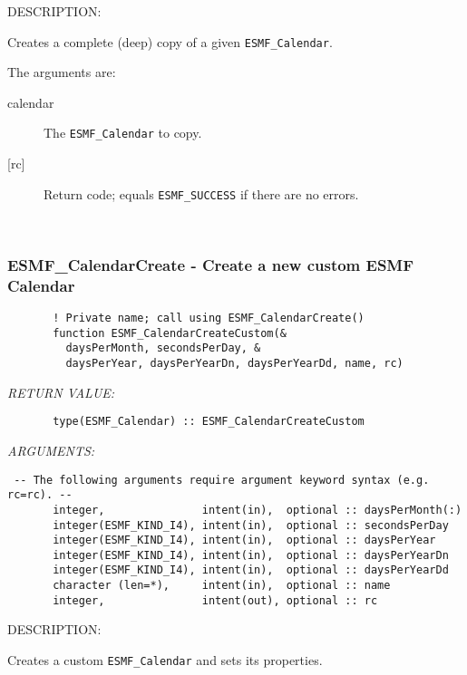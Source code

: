 {\sf DESCRIPTION:\\ }


       Creates a complete (deep) copy of a given {\tt ESMF\_Calendar}.
  
       The arguments are:
       \begin{description}
       \item[calendar]
          The {\tt ESMF\_Calendar} to copy.
       \item[{[rc]}]
          Return code; equals {\tt ESMF\_SUCCESS} if there are no errors.
       \end{description}
   
 
\mbox{}\hrulefill\ 
 
\subsubsection [ESMF\_CalendarCreate] {ESMF\_CalendarCreate - Create a new custom ESMF Calendar}


 
\begin{verbatim}       ! Private name; call using ESMF_CalendarCreate()
       function ESMF_CalendarCreateCustom(&
         daysPerMonth, secondsPerDay, &
         daysPerYear, daysPerYearDn, daysPerYearDd, name, rc)
 \end{verbatim}{\em RETURN VALUE:}
\begin{verbatim}       type(ESMF_Calendar) :: ESMF_CalendarCreateCustom
 \end{verbatim}{\em ARGUMENTS:}
\begin{verbatim} -- The following arguments require argument keyword syntax (e.g. rc=rc). --
       integer,               intent(in),  optional :: daysPerMonth(:)
       integer(ESMF_KIND_I4), intent(in),  optional :: secondsPerDay
       integer(ESMF_KIND_I4), intent(in),  optional :: daysPerYear
       integer(ESMF_KIND_I4), intent(in),  optional :: daysPerYearDn
       integer(ESMF_KIND_I4), intent(in),  optional :: daysPerYearDd
       character (len=*),     intent(in),  optional :: name
       integer,               intent(out), optional :: rc
 \end{verbatim}
{\sf DESCRIPTION:\\ }


       Creates a custom {\tt ESMF\_Calendar} and sets its properties.
  
